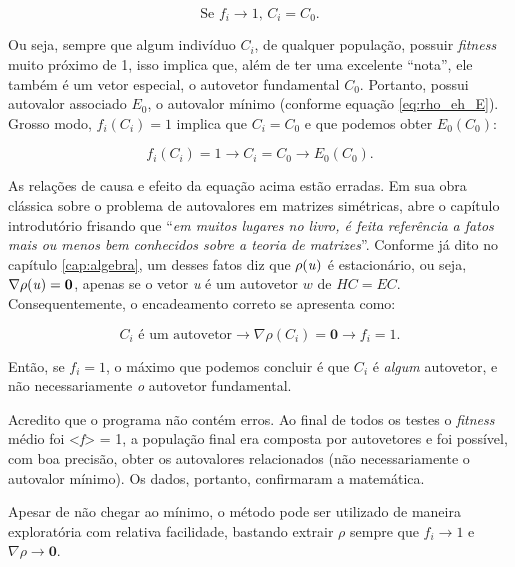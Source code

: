 \begin{equation}\label{eq:afirmacaoErrada}
	\mbox{Se } f_i \rightarrow 1\mbox{, } C_i = C_0.
\end{equation}

Ou seja, sempre que algum indivíduo $C_i$, de qualquer população, possuir \textit{fitness} muito próximo de 1, isso implica que, além de ter uma excelente ``nota'', ele também é um vetor especial, o autovetor fundamental $C_0$. Portanto, possui autovalor associado $E_0$, o autovalor mínimo (conforme equação \ref{eq:rho_eh_E}). Grosso modo, $f_i(C_i) = 1$ implica que $C_i = C_0$ e que podemos obter $E_0(C_0)$:

\begin{equation}\label{eq:causalidadeErrada}
	f_i(C_i) = 1 \rightarrow C_i = C_0 \rightarrow E_0(C_0).
\end{equation}

As relações de causa e efeito da equação acima estão erradas. Em sua obra clássica sobre o problema de autovalores em matrizes simétricas, \cite{Parlett1998} abre o capítulo introdutório frisando que ``\textit{em muitos lugares no livro, é feita referência a fatos mais ou menos bem conhecidos sobre a teoria de matrizes}''. Conforme já dito no capítulo \ref{cap:algebra}, um desses fatos diz que $\rho(\mbox{\textit{u}})$ é estacionário, ou seja, $\nabla \rho(\mbox{\textit{u}}) = \textbf{0}$, apenas se o vetor \textit{u} é um autovetor $w$ de $HC = EC$. Consequentemente, o encadeamento correto se apresenta como:

\begin{equation}\label{eq:causalidadeCorreta}
	C_i \mbox{ é um autovetor} \rightarrow \nabla \rho(C_i) = \textbf{0} \rightarrow f_i = 1.
\end{equation}
	
Então, se $f_i = 1$, o máximo que podemos concluir é que $C_i$ é \textit{algum} autovetor, e não necessariamente \textit{o} autovetor fundamental.

Acredito que o programa não contém erros. Ao final de todos os testes o \textit{fitness} médio foi <\textit{f}> = 1, a população final era composta por autovetores e foi possível, com boa precisão, obter os autovalores relacionados (não necessariamente o autovalor mínimo). Os dados, portanto, confirmaram a matemática.

Apesar de não chegar ao mínimo, o método pode ser utilizado de maneira exploratória com relativa facilidade, bastando extrair $\rho$ sempre que $f_i \rightarrow 1$ e $\nabla \rho \rightarrow \textbf{0}$. 


